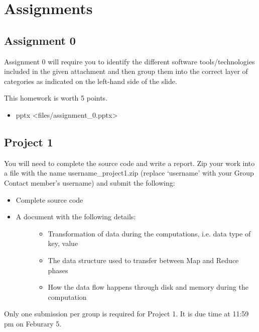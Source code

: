 \part{Assignments}\label{assignments}

\chapter{Assignment 0}\label{assignment-0}

Assignment 0 will require you to identify the different software
tools/technologies included in the given attachment and then group them
into the correct layer of categories as indicated on the left-hand side
of the slide.

This homework is worth 5 points.

\begin{itemize}
\tightlist
\item
  pptx \textless{}files/assignment\_0.pptx\textgreater{}
\end{itemize}

\chapter{Project 1}\label{project-1}

You will need to complete the source code and write a report. Zip your
work into a file with the name username\_project1.zip (replace
`username' with your Group Contact member's username) and submit the
following:

\begin{itemize}
\item
  Complete source code
\item
  \begin{description}
  \item[A document with the following details:]
  \begin{itemize}
  \tightlist
  \item
    Transformation of data during the computations, i.e. data type of
    key, value
  \item
    The data structure used to transfer between Map and Reduce phases
  \item
    How the data flow happens through disk and memory during the
    computation
  \end{itemize}
  \end{description}
\end{itemize}

Only one submission per group is required for Project 1. It is due time
at 11:59 pm on Feburary 5.


